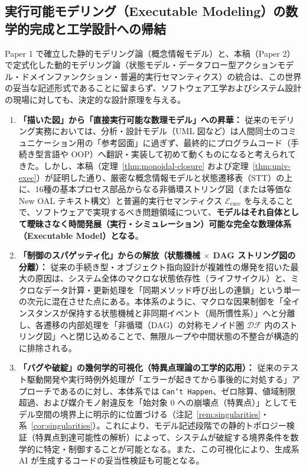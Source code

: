 \documentclass[11pt,a4paper]{ltjsarticle}
\theoremstyle{definition}
\theoremstyle{plain}
\theoremstyle{remark}
\newcommand{\DF}{\mathcal{DF}}
\begin{document}
\subsection{実行可能モデリング（Executable Modeling）の数学的完成と工学設計への帰結}
Paper 1 で確立した静的モデリング論（概念情報モデル）と、本稿（Paper 2）で定式化した動的モデリング論（状態モデル・データフロー型アクションモデル・ドメインファンクション・普遍的実行セマンティクス）の統合は、この世界の妥当な記述形式であることに留まらず、ソフトウェア工学およびシステム設計の現場に対しても、決定的な設計原理を与える。
\begin{enumerate}
    \item \textbf{「描いた図」から「直接実行可能な数理モデル」への昇華：}
    従来のモデリング実務においては、分析・設計モデル（UML 図など）は人間同士のコミュニケーション用の「参考図面」に過ぎず、最終的にプログラムコード（手続き型言語や OOP）へ翻訳・実装して初めて動くものになると考えられてきた。しかし、本稿（定理~\ref{thm:monoidal-closure} および定理~\ref{thm:univ-exec}）が証明した通り、厳密な概念情報モデルと状態遷移表（STT）の上に、16種の基本プロセス部品からなる非循環ストリング図（または等価な New OAL テキスト構文）と普遍的実行セマンティクス $\mathcal{E}_{\mathrm{exec}}$ を与えることで、ソフトウェアで実現するべき問題領域について、\textbf{モデルはそれ自体として曖昧さなく時間発展（実行・シミュレーション）可能な完全な数理体系（Executable Model）となる}。
    \item \textbf{「制御のスパゲッティ化」からの解放（状態機械 $\times$ DAG ストリング図の分離）：}
    従来の手続き型・オブジェクト指向設計が複雑性の爆発を招いた最大の原因は、システム全体のマクロな状態依存性（ライフサイクル）と、ミクロなデータ計算・更新処理を「同期メソッド呼び出しの連鎖」という単一の次元に混在させた点にある。本体系のように、マクロな因果制御を「全インスタンスが保持する状態機械と非同期イベント（局所慣性系）」へと分離し、各遷移の内部処理を「非循環（DAG）の対称モノイド圏 $\DF$ 内のストリング図」へと閉じ込めることで、無限ループや中間状態の不整合が構造的に排除される。
    \item \textbf{「バグや破綻」の幾何学的可視化（特異点理論の工学的応用）：}
    従来のテスト駆動開発や実行時例外処理が「エラーが起きてから事後的に対処する」アプローチであるのに対し、本体系では \texttt{Can't Happen}、ゼロ除算、値域制限超過、および媒介モノ射違反を「始対象 $0$ への崩壊点（特異点）」としてモデル空間の境界上に明示的に位置づける（注記~\ref{rem:singularities}・系~\ref{cor:singularities}）。これにより、モデル記述段階での静的トポロジー検証（特異点到達可能性の解析）によって、システムが破綻する境界条件を数学的に特定・制御することが可能となる。また、この可視化により、生成系 AI が生成するコードの妥当性検証も可能となる。
\end{enumerate}
\end{document}
